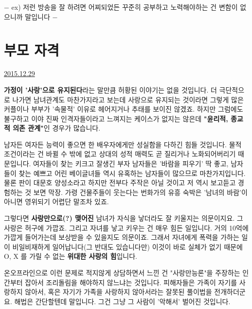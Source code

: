 $-$ ex) 저런 방송을 잘 하려면 어찌되었든 꾸준히 공부하고 노력해야하는 건 변함이 없으니까 말입니다 $-$
\vspace{5mm}






\section{부모 자격}
\href{https://www.kockoc.com/Apoc/568250}{2015.12.29}

\vspace{5mm}

\textbf{가정이 '사랑'으로 유지된다}라는 말만큼 허황된 이야기는 없을 것입니다.
더 극단적으로 나가면 남녀관계도 마찬가지라고 보는데
사랑으로 유지되는 것이라면 그렇게 많은 커플이나 부부가  '속물적' 이유로 헤어지거나 추태를 보이진 않겠죠.
하지만 그럼에도 불구하고 이야 진짜 인격자들이라고 느껴지는 케이스가 없지는 않은데
\textbf{"윤리적, 종교적 의존 관계"}인 경우가 많습니다.
\vspace{5mm}

남자든 여자든 능력이 좋으면 한 배우자에게만 성실함을 다하긴 힘들 것입니다.
물적 조건이라는 건 바뀔 수 밖에 없고 상대의 성적 매력도 곧 질리거나 노화되어버리기 때문입니다.
여자들이 찾는 키크고 잘생긴 부자 남자들은 '바람을 피우기' 딱 좋고,
남자들이 찾는 예쁘고 어린 베이글녀들 역시 유혹하는 남자들이 많으므로 마찬가지입니다.
물론 판이 대문호 양성소라고 하지만 전부다 주작은 아닐 것이고 저 역시 보고듣고 경험하는 것 보면 막장.
가령 건물주들이 웃는다는 번화가의 유흥 숙박은 '남녀의 바람'이 아니면 영위되기 어렵단 말조차 있죠.
\vspace{5mm}

그렇다면 \textbf{사랑만으로(?) 맺어진} 남녀가 자식을 낳더라도 잘 키울지는 의문이지요.
그 사랑은 허구에 가깝죠. 그리고 자녀를 낳고 키우는 건 매우 힘든 일입니다.
거의 10억에 가깝게 들어가는데 보상받을 수 있을지도 의문이죠.
그래서 자녀에게 폭력을 가하는 일이 비일비재하게 일어납니다(그 반대도 있습니다만)
이것이 바로 실체가 없기 때문에 O, X 를 가릴 수 없는 \textbf{위대한 사랑의 힘}입니다.
\vspace{5mm}

온오프라인으로 이런 문제로 적지않게 상담하면서 느낀 건
"사랑만능론"을 주장하는 인간부터 잡아서 조리돌림을 해야하지 않느냐는 것입니다.
피해자들은 가족이 자기를 사랑하지 않아서, 혹은 자기가 가족을 사랑하지 않아서라는 잘못된 풀이법을 전개하더군요.
해법은 간단할텐데 말입니다. 그건 그냥 그 사람이 '악해서' 벌어진 것입니다.
\vspace{5mm}

